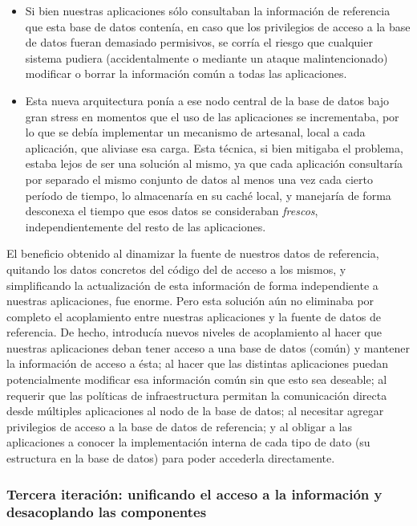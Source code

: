 \begin{itemize}
  \item Si bien nuestras aplicaciones sólo consultaban la información de referencia que esta base de datos contenía, en caso que los privilegios de acceso a la base de datos fueran demasiado permisivos, se corría el riesgo que cualquier sistema pudiera (accidentalmente o mediante un ataque malintencionado) modificar o borrar la información común a todas las aplicaciones.

  \item Esta nueva arquitectura ponía a ese nodo central de la base de datos bajo gran stress en momentos que el uso de las aplicaciones se incrementaba, por lo que se debía implementar un mecanismo de  artesanal, local a cada aplicación, que aliviase esa carga. Esta técnica, si bien mitigaba el problema, estaba lejos de ser una solución al mismo, ya que cada aplicación consultaría por separado el mismo conjunto de datos al menos una vez cada cierto período de tiempo, lo almacenaría en su caché local, y manejaría de forma desconexa el tiempo que esos datos se consideraban \textit{frescos}, independientemente del resto de las aplicaciones.
\end{itemize}

El beneficio obtenido al dinamizar la fuente de nuestros datos de referencia, quitando los datos concretos del código del  de acceso a los mismos, y simplificando la actualización de esta información de forma independiente a nuestras aplicaciones, fue enorme. Pero esta solución aún no eliminaba por completo el acoplamiento entre nuestras aplicaciones y la fuente de datos de referencia. De hecho, introducía nuevos niveles de acoplamiento al hacer que nuestras aplicaciones deban tener acceso a una base de datos (común) y mantener la información de acceso a ésta; al hacer que las distintas aplicaciones puedan potencialmente modificar esa información común sin que esto sea deseable; al requerir que las políticas de infraestructura permitan la comunicación directa desde múltiples aplicaciones al nodo de la base de datos; al necesitar agregar privilegios de acceso a la base de datos de referencia; y al obligar a las aplicaciones a conocer la implementación interna de cada tipo de dato (su estructura en la base de datos) para poder accederla directamente.


\subsubsection{Tercera iteración: unificando el acceso a la información y desacoplando las componentes}
\label{nube:etapa3}

